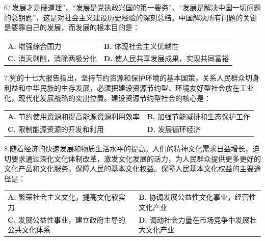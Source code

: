 \documentclass[UTF8,11pt]{ctexart}
\begin{document}
6.“发展才是硬道理”、“发展是党执政兴国的第一要务”、“发展是解决中国一切问题的总钥匙”，这是对社会主义建设历史经验的深刻总结。中国解决所有问题的关键是要靠自己的发展，而发展的根本目的是：


\begin{center}\begin{tabular}{>{\raggedright\arraybackslash}p{\dimexpr(\linewidth-4\tabcolsep)/2\relax}>{\raggedright\arraybackslash}p{\dimexpr(\linewidth-4\tabcolsep)/2\relax}}
\textbf{A.} 增强综合国力 & \textbf{B.} 体现社会主义优越性\\[.35em]
\textbf{C.} 消灭剥削，消除两极分化 & \textbf{D.} 使人民共享发展成果，实现共同富裕\\[.35em]\end{tabular}\end{center}

7.党的十七大报告指出，坚持节约资源和保护环境的基本国策，关系人民群众切身利益和中华民族的生存发展，必须把建设资源节约型、环境友好型社会放在工业化，现代化发展战略的突出位置。建设资源节约型社会的核心是：


\begin{center}\begin{tabular}{>{\raggedright\arraybackslash}p{\dimexpr(\linewidth-4\tabcolsep)/2\relax}>{\raggedright\arraybackslash}p{\dimexpr(\linewidth-4\tabcolsep)/2\relax}}
\textbf{A.} 节约使用资源和提高能源资源利用效率 & \textbf{B.} 加强节能减排和生态保护工作\\[.35em]
\textbf{C.} 限制能源资源的开发和利用 & \textbf{D.} 发展循环经济\\[.35em]\end{tabular}\end{center}

8.随着经济的快速发展和物质生活水平的提高。人们的精神文化需求日益增长，迫切要求通过深化文化体制改革，激发文化发展的活力，为人民群众提供更多更好的文化产品和文化服务，保障人民的基本文化权益。保障人民基本文化权益的主要途径是：


\begin{center}\begin{tabular}{>{\raggedright\arraybackslash}p{\dimexpr(\linewidth-4\tabcolsep)/2\relax}>{\raggedright\arraybackslash}p{\dimexpr(\linewidth-4\tabcolsep)/2\relax}}
\textbf{A.} 繁荣社会主义文化，提高文化软实力 & \textbf{B.} 协调发展公益性文化事业，经营性文化产业\\[.35em]
\textbf{C.} 发展公益性事业，建立政府主导的公共文化体系 & \textbf{D.} 调动社会力量在市场竞争中发展壮大文化产业\\[.35em]\end{tabular}\end{center}
\end{document}
